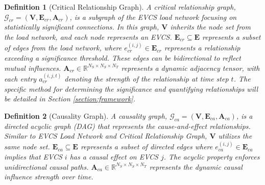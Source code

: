 \documentclass[lettersize,journal]{IEEEtran}
\newtheorem{definition}{\textbf{Definition}}[section]
\begin{document}
\begin{definition}[Critical Relationship Graph] \label{def:cr_graph}
	A critical relationship graph, $\bm{\mathcal{G}}_{cr} = (\bm{V}, \bm{E}_{cr}, \bm{A}_{cr})$, is a subgraph of the EVCS load network focusing on statistically significant connections. In this graph, $\bm{V}$ inherits the node set from the load network, and each node represents an EVCS. $\bm{E}_{cr} \subseteq \bm{E}$ represents a subset of edges from the load network, where $e^{(i, j)}_{cr} \in \bm{E}_{cr}$ represents a relationship exceeding a significance threshold. These edges can be bidirectional to reflect mutual influences. $\bm{A}_{cr} \in \mathbb{R}^{N_S \times N_S \times N_T}$ represents a dynamic adjacency tensor, with each entry $a^{(i, j, t)}_{cr}$ denoting the strength of the relationship at time step $t$.  The specific method for determining the significance and quantifying relationships will be detailed in Section \ref{section:framework}.
\end{definition}

\begin{definition}[Causality Graph] 
	A causality graph, $\bm{\mathcal{G}}_{ca} = (\bm{V}, \bm{E}_{ca}, \bm{A}_{ca})$, is a directed acyclic graph (DAG) that represents the cause-and-effect relationships. Similar to EVCS Load Network and  Critical Relationship Graph, $\bm{V}$ utilizes the same node set. $\bm{E}_{ca} \subseteq \bm{E}$ represents a subset of directed edges where $e^{(i, j)}_{ca} \in \bm{E}_{ca}$ implies that EVCS $i$ has a causal effect on EVCS $j$. The acyclic property enforces unidirectional causal paths. $\bm{A}_{ca}  \in \mathbb{R}^{N_S \times N_S \times N_T}$ represents the dynamic causal influence strength over time.
\end{definition}
\end{document}
